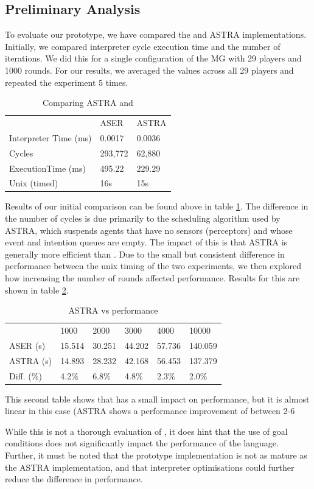 \subsection{Preliminary Analysis}
\label{performance}

To evaluate our prototype, we have compared the {\aser} and ASTRA implementations. Initially,
we compared interpreter cycle execution time and the number of iterations. We did this for a
single configuration of the MG with 29 players and 1000 rounds. For our results, we averaged
the values across all 29 players and repeated the experiment 5 times.

\begin{table}[]
\centering
\caption{Comparing ASTRA and {\aser}}
\label{comparison}
\begin{tabular}{lll}
                      & ASER    & ASTRA  \\
Interpreter Time (ms) & 0.0017  & 0.0036 \\
Cycles                & 293,772 & 62,880 \\
ExecutionTime (ms)    & 495.22  & 229.29 \\
Unix (timed)          & 16s     & 15s   
\end{tabular}
\end{table}

Results of our initial comparison can be found above in table \ref{comparison}. The difference
in the number of cycles is due primarily to the scheduling algorithm used by ASTRA, which
suspends agents that have no sensors (perceptors) and whose event and intention queues are empty.
The impact of this is that ASTRA is generally more efficient than {\aser}. Due to the small but 
consistent difference in performance between the unix timing of the two experiments, we then 
explored how increasing the number of rounds affected performance. Results for this are shown 
in table \ref{rounds}.

\begin{table}[]
\centering
\caption{ASTRA vs {\aser} performance}
\label{rounds}
\begin{tabular}{llllll}
           & 1000   & 2000   & 3000   & 4000   & 10000   \\
ASER (s)   & 15.514 & 30.251 & 44.202 & 57.736 & 140.059 \\
ASTRA (s)  & 14.893 & 28.232 & 42.168 & 56.453 & 137.379 \\
Diff. (\%) & 4.2\%  & 6.8\%  & 4.8\%  & 2.3\%  & 2.0\%  
\end{tabular}
\end{table}

This second table shows that {\aser} has a small impact on performance, but it is 
almost linear in this case (ASTRA shows a performance improvement of between 2-6%

While this is not a thorough evaluation of {\aser}, it does hint that the use of
goal conditions does not significantly impact the performance of the language. Further,
it must be noted that the prototype implementation is not as mature as the ASTRA
implementation, and that interpreter optimisations could further reduce the difference 
in performance.

